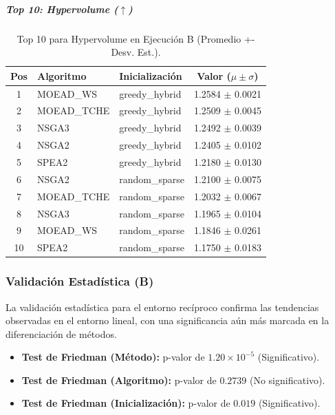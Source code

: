 \documentclass[a4paper,10pt]{article}
\begin{document}
\subparagraph{Top 10: Hypervolume ($\uparrow$)}
\begin{table}[H]
    \centering
    \begin{tabular}{cllc}
        \toprule
        Pos & Algoritmo & Inicialización & Valor ($\mu \pm \sigma$) \\
        \midrule
        1 & MOEAD\_WS & greedy\_hybrid & 1.2584 $\pm$ 0.0021 \\
        2 & MOEAD\_TCHE & greedy\_hybrid & 1.2509 $\pm$ 0.0045 \\
        3 & NSGA3 & greedy\_hybrid & 1.2492 $\pm$ 0.0039 \\
        4 & NSGA2 & greedy\_hybrid & 1.2405 $\pm$ 0.0102 \\
        5 & SPEA2 & greedy\_hybrid & 1.2180 $\pm$ 0.0130 \\
        6 & NSGA2 & random\_sparse & 1.2100 $\pm$ 0.0075 \\
        7 & MOEAD\_TCHE & random\_sparse & 1.2032 $\pm$ 0.0067 \\
        8 & NSGA3 & random\_sparse & 1.1965 $\pm$ 0.0104 \\
        9 & MOEAD\_WS & random\_sparse & 1.1846 $\pm$ 0.0261 \\
        10 & SPEA2 & random\_sparse & 1.1750 $\pm$ 0.0183 \\
        \bottomrule
    \end{tabular}
    \caption{Top 10 para Hypervolume en Ejecución B (Promedio +- Desv. Est.).}
\end{table}


\subsubsection{Validación Estadística (B)}
La validación estadística para el entorno recíproco confirma las tendencias observadas en el entorno lineal, con una significancia aún más marcada en la diferenciación de métodos.

\begin{itemize}
    \item \textbf{Test de Friedman (Método):} p-valor de $1.20 \times 10^{-5}$ (Significativo).
    \item \textbf{Test de Friedman (Algoritmo):} p-valor de $0.2739$ (No significativo).
    \item \textbf{Test de Friedman (Inicialización):} p-valor de $0.019$ (Significativo).
\end{itemize}
\end{document}
